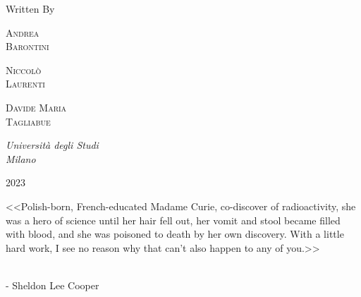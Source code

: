 \documentclass{article}
\newcommand{\plogo}{\fbox{$\mathcal{BLT}$}} %
\begin{document}
\begin{titlepage}
	Written By
	
	\vspace{0.5\baselineskip} %
	
	{\scshape\Large Andrea  \\ Barontini} %

    \vspace{0.5\baselineskip} %
	
	{\scshape\Large Niccolò \\ Laurenti} %

    \vspace{0.5\baselineskip} %
	
	{\scshape\Large Davide Maria \\ Tagliabue} %
	
	\vspace{5\baselineskip} %
	
	\textit{Università degli Studi \\ Milano} %
	
	\vfill %
	
	
	\plogo %
	
	\vspace{0.3\baselineskip} %
	
	
    {\large 2023}
    

\end{titlepage}


\clearpage
\begin{center}
    \thispagestyle{empty}
    \vspace*{\fill}
    \begin{em}
        <<Polish-born, French-educated Madame Curie, co-discover of radioactivity, she was a hero of science until her hair fell out, her vomit and stool became filled with blood, and she was poisoned to death by her own discovery. With a little hard work, I see no reason why that can't also happen to any of you.>>
    \end{em}
    \vspace{0.5cm} \\
    \hspace{11cm}  - Sheldon Lee Cooper 
    \vspace*{\fill}
\end{center}
\clearpage
\end{document}
